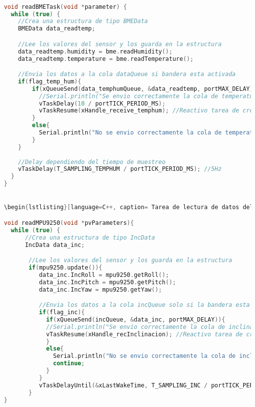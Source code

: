 \begin{lstlisting}[language=C++, caption=Tarea de lectura de datos de temperatura y humedad]

void readBMETask(void *parameter) {
  while (true) {
    //Crea una estructura de tipo BMEData
    BMEData data_readtemp;

    //Lee los valores del sensor y los guarda en la estructura
    data_readtemp.humidity = bme.readHumidity();
    data_readtemp.temperature = bme.readTemperature();

    //Envia los datos a la cola dataQueue si bandera esta activada
    if(flag_temp_hum){
        if(xQueueSend(data_temphumQueue, &data_readtemp, portMAX_DELAY)){
          //Serial.println("Se envio correctamente la cola de temperatura");
          vTaskDelay(10 / portTICK_PERIOD_MS);
          vTaskResume(xHandle_receive_temphum); //Reactivo tarea de creacion de buffers y promedios
        }
        else{
          Serial.println("No se envio correctamente la cola de temperatura");
        }
    }
    
    //Delay dependiendo del tiempo de muestreo
    vTaskDelay(T_SAMPLING_TEMPHUM / portTICK_PERIOD_MS); //5Hz
  }
}


\begin{lstlisting}[language=C++, caption= Tarea de lectura de datos del MPU9250]

void readMPU9250(void *pvParameters){
  while (true) {
      //Crea una estructura de tipo IncData
      IncData data_inc;

       //Lee los valores del sensor y los guarda en la estructura
       if(mpu9250.update()){
          data_inc.IncRoll = mpu9250.getRoll();
          data_inc.IncPitch = mpu9250.getPitch();
          data_inc.IncYaw = mpu9250.getYaw();

          //Envia los datos a la cola incQueue solo si la bandera esta activada
          if(flag_inc){
            if(xQueueSend(incQueue, &data_inc, portMAX_DELAY)){
            //Serial.println("Se envio correctamente la cola de inclinacion");
            vTaskResume(xHandle_recInclinacion); //Reactivo tarea de creacion de buffers y promedios
            }
            else{
              Serial.println("No se envio correctamente la cola de inclinacion");
              continue;
            }
          }
          vTaskDelayUntil(&xLastWakeTime, T_SAMPLING_INC / portTICK_PERIOD_MS)
       }
}
\end{lstlisting}

